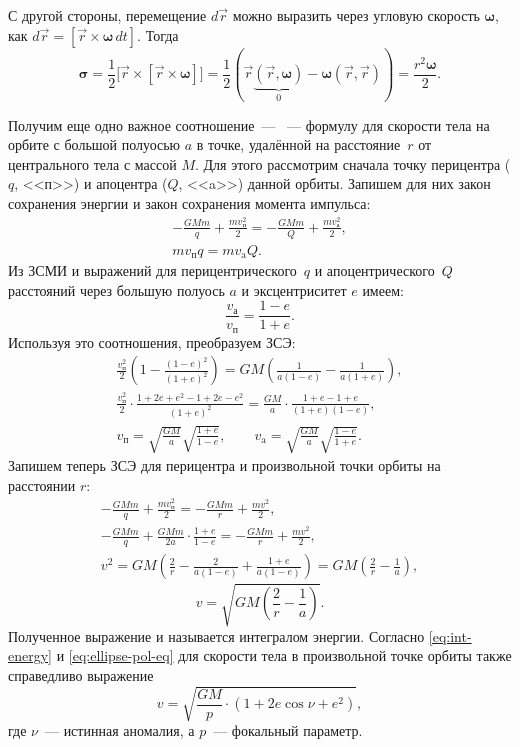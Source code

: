 С другой стороны, перемещение $d\vec{r}$ можно выразить через угловую скорость $\boldsymbol{\omega}$, как $d \vec{r} = [\vec{r} \times \boldsymbol{\omega} \,d t]$. Тогда
\begin{equation*}
	\boldsymbol{\sigma}
	= \frac{1}{2} \big[ \vec{r} \times [\vec{r} \times \boldsymbol{\omega} ]\big]
	= \frac{1}{2} \left(\vec{r} \underbrace{(\vec{r}, \boldsymbol{\omega})}_0 - \boldsymbol{\omega} ( \vec{r}, \vec{r} ) \right)
	= \frac{r^2 \boldsymbol{\omega}}{2}.
\end{equation*}

Получим еще одно важное соотношение~--- ~--- формулу для скорости тела на орбите с большой полуосью $a$ в точке, удалённой на расстояние~$r$ от центрального тела с массой $M$. Для этого рассмотрим  сначала точку перицентра ($q$, <<п>>) и апоцентра ($Q$, <<a>>) данной орбиты. Запишем для них закон сохранения энергии и закон сохранения момента импульса:
\begin{gather*}
	-\frac{GMm}{q} + \frac{m v^2_\text{п}}{2} = -\frac{GMm}{Q} + \frac{m v^2_\text{а}}{2},\\
	mv_\text{п}q = mv_\text{a}Q.
\end{gather*}
Из ЗСМИ и выражений для перицентрического~$q$ и апоцентрического~$Q$ расстояний через большую полуось $a$ и эксцентриситет $e$ имеем:
\begin{equation*}
	\frac{v_\text{а}}{v_\text{п}} = \frac{1 - e}{1 + e}.
\end{equation*}
Используя это соотношения, преобразуем ЗСЭ:
\begin{gather}
	\frac{v_\text{п}^2}{2} \left( 1 - \frac{(1 -e)^2}{(1 + e)^2} \right) = GM \left( \frac{1}{a(1-e)} - \frac{1}{a(1+e)} \right),\\
	\frac{v_\text{п}^2}{2} \cdot \frac{ 1 + 2e + e^2 - 1 + 2e - e^2}{(1+e)^2} = \frac{GM}{a} \cdot \frac{1 + e - 1 +  e}{(1+e)(1-e)},\\
	v_\text{п} = \sqrt{\frac{GM}{a}}\sqrt{\frac{1+e}{1-e}}, \quad \quad v_\text{a} = \sqrt{\frac{GM}{a}}\sqrt{\frac{1-e}{1+e}}.
\end{gather}
Запишем теперь ЗСЭ для перицентра и произвольной точки орбиты на расстоянии $r$:
\begin{gather*}
	-\frac{GMm}{q} + \frac{m v^2_\text{п}}{2} = -\frac{GMm}{r} + \frac{m v^2}{2},\\
	-\frac{GMm}{q} + \frac{GMm}{2a} \cdot \frac{1+e}{1-e} = -\frac{GMm}{r} + \frac{m v^2}{2},\\
	v^2 = GM \left( \frac{2}{r} - \frac{2}{a(1 - e)} + \frac{1+e}{a (1-e) }\right) = GM \left( \frac{2}{r} - \frac{1}{a} \right),
\end{gather*}
\begin{equation}
	v = \sqrt{ GM \left( \frac{2}{r} - \frac{1}{a} \right)}.
	\label{eq:int-energy}
\end{equation}
Полученное выражение и называется интегралом энергии. Согласно \eqref{eq:int-energy} и \eqref{eq:ellipse-pol-eq} для скорости тела в произвольной точке орбиты также справедливо выражение
\begin{equation}
	v = \sqrt{\frac{GM}{p}\cdot(1 + 2 e \cos \nu + e^2)},
\end{equation}
где $\nu$~--- истинная аномалия, а $p$~--- фокальный параметр.


